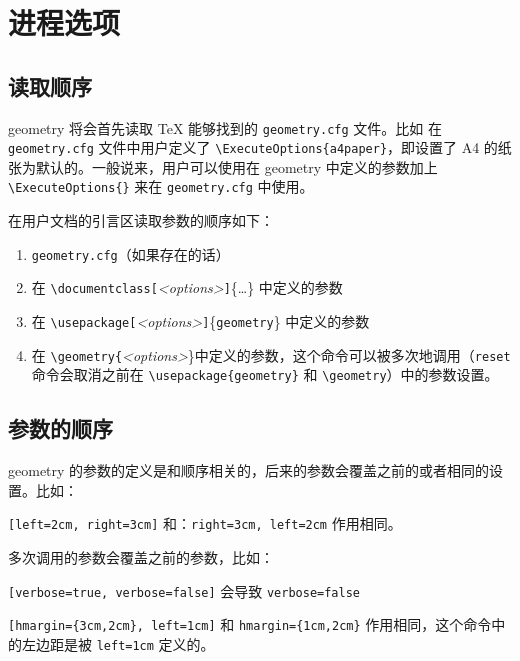 \documentclass[titlepage]{ctexart}
\def\Gm{\textsf{geometry}}
\begin{document}
	\section{进程选项}\label{sec:process}
	\subsection{读取顺序}\label{sec:loadorder}
	
	\Gm{} 将会首先读取 \TeX{} 能够找到的 \verb|geometry.cfg| 文件。比如 在 \verb|geometry.cfg| 文件中用户定义了 \verb|\ExecuteOptions{a4paper}|，即设置了 A4 的纸张为默认的。一般说来，用户可以使用在 \Gm{} 中定义的参数加上 \verb|\ExecuteOptions{}| 来在 \verb|geometry.cfg| 中使用。 
	
	在用户文档的引言区读取参数的顺序如下：
	
	\begin{enumerate}
	\item \verb|geometry.cfg|（如果存在的话）
	\item 在 \verb|\documentclass[|\emph{<options>}\verb|]|\{\ldots\} 中定义的参数
	\item 在 \verb|\usepackage[|\emph{<options>}\verb|]|\{\verb|geometry|\} 中定义的参数
	\item 在 \verb|\geometry{|\emph{<options>}\}中定义的参数，这个命令可以被多次地调用（\verb|reset| 命令会取消之前在 \verb|\usepackage{geometry}| 和 \verb|\geometry|）中的参数设置。
	\end{enumerate}
	
	\subsection{参数的顺序}\label{sec:optionorder}
	
	\Gm{} 的参数的定义是和顺序相关的，后来的参数会覆盖之前的或者相同的设置。比如：
	\begin{center}
	\verb|[left=2cm, right=3cm]| 和：\verb|right=3cm, left=2cm| 作用相同。
	\end{center}
	多次调用的参数会覆盖之前的参数，比如：
	\begin{center}
	\verb|[verbose=true, verbose=false]| 会导致 \verb|verbose=false|
	\end{center}
	\verb|[hmargin={3cm,2cm}, left=1cm]| 和 \verb|hmargin={1cm,2cm}| 作用相同，这个命令中的左边距是被 \verb|left=1cm| 定义的。
	
\end{document}

